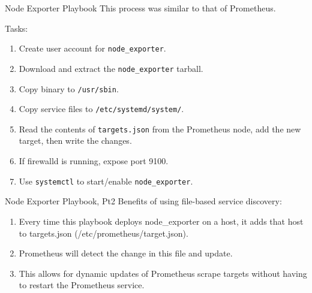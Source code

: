\documentclass[14pt,compress,usenames,dvipsnames,aspectratio=169]{beamer}
\begin{document}
\begin{frame}{Node Exporter Playbook}
    This process was similar to that of Prometheus.  
 
    Tasks:
    \begin{enumerate}
        \item{Create user account for \texttt{node\_exporter}.} 
        \item{Download and extract the \texttt{node\_exporter} tarball.} 
        \item{Copy binary to \texttt{/usr/sbin}.} 
        \item{Copy service files to \texttt{/etc/systemd/system/}. } 
        \item{Read the contents of \texttt{targets.json} from the Prometheus node,
            add the new target, then write the changes.} 
        \item{If firewalld is running, expose port 9100. } 
        \item{Use \texttt{systemctl} to start/enable \texttt{node\_exporter}.} 
    \end{enumerate}
\end{frame}


\begin{frame}{Node Exporter Playbook, Pt2}
    Benefits of using file-based service discovery:
    \begin{enumerate}
        \item{Every time this playbook deploys node\_exporter on a host, it adds 
            that host to targets.json (/etc/prometheus/target.json).} 
        \item{Prometheus will detect the change in this file and update.} 
        \item{This allows for dynamic updates of Prometheus scrape targets without
            having to restart the Prometheus service.} 
    \end{enumerate}
\end{frame}
\end{document}
